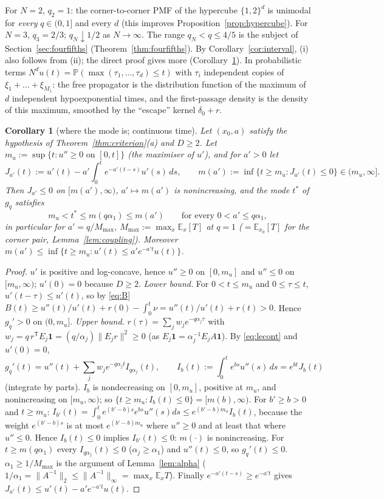 \documentclass[11pt,a4paper]{article}
\newtheorem{corollary}[theorem]{Corollary}
\theoremstyle{definition}
\newcommand{\one}{\mathbf 1}
\newcommand{\Prob}{\mathbb P}
\newcommand{\E}{\mathbb E}
\newcommand{\T}{^{\mathsf T}}
\begin{document}
For $N=2$, $q_2=1$: the corner-to-corner PMF of the hypercube $\{1,2\}^d$ is unimodal for \emph{every} $q\in(0,1]$ and every $d$ (this improves Proposition~\ref{prop:hypercube}). For $N=3$, $q_3=2/3$; $q_N\downarrow1/2$ as $N\to\infty$. The range $q_N<q\le4/5$ is the subject of Section~\ref{sec:fourfifths} (Theorem~\ref{thm:fourfifths}). By Corollary~\ref{cor:interval}, (i) also follows from (ii); the direct proof gives more (Corollary~\ref{cor:mode}). In probabilistic terms $N^du(t)=\Prob(\max(\tau_1,\dots,\tau_d)\le t)$ with $\tau_i$ independent copies of $\xi_1+\dots+\xi_{M_1}$: the free propagator is the distribution function of the maximum of $d$ independent hypoexponential times, and the first-passage density is the density of this maximum, smoothed by the ``escape'' kernel $\delta_0+r$.

\begin{corollary}[where the mode is; continuous time]\label{cor:mode}
Let $(x_0,a)$ satisfy the hypothesis of Theorem~\ref{thm:criterion}(a) and $D\ge2$. Let $m_u:=\sup\{t:u''\ge0\text{ on }[0,t]\}$ (the maximiser of $u'$), and for $a'>0$ let
\[
J_{a'}(t):=u'(t)-a'\int_0^te^{-a'(t-s)}u'(s)\,ds,\qquad m(a'):=\inf\{t\ge m_u:J_{a'}(t)\le0\}\in(m_u,\infty].
\]
Then $J_{a'}\le0$ on $[m(a'),\infty)$, $a'\mapsto m(a')$ is nonincreasing, and the mode $t^*$ of $g_q$ satisfies
\[
m_u<t^*\le m(q\alpha_1)\le m(a')\qquad\text{for every }0<a'\le q\alpha_1,
\]
in particular for $a'=q/M_{\max}$, $M_{\max}:=\max_x\E_x[T]$ at $q=1$ ($=\E_{x_0}[T]$ for the corner pair, Lemma~\ref{lem:coupling}). Moreover $m(a')\le\inf\{t\ge m_u:u'(t)\le a'e^{-a't}u(t)\}$.
\end{corollary}
\begin{proof}
$u'$ is positive and log-concave, hence $u''\ge0$ on $[0,m_u]$ and $u''\le0$ on $[m_u,\infty)$; $u'(0)=0$ because $D\ge2$.
\emph{Lower bound.} For $0<t\le m_u$ and $0\le\tau\le t$, $u'(t-\tau)\le u'(t)$, so by \eqref{eq:B} $B(t)\ge u''(t)/u'(t)+r(0)-\int_0^t\nu=u''(t)/u'(t)+r(t)>0$. Hence $g_q'>0$ on $(0,m_u]$.
\emph{Upper bound.} $r(\tau)=\sum_jw_je^{-q\alpha_j\tau}$ with $w_j=q\,r\T E_j\one=(q/\alpha_j)\|E_jr\|^2\ge0$ (as $E_j\one=\alpha_j^{-1}E_jA\one$). By \eqref{eq:lecont} and $u'(0)=0$,
\[
g_q'(t)=u''(t)+\sum_jw_je^{-q\alpha_jt}I_{q\alpha_j}(t),\qquad I_b(t):=\int_0^te^{bs}u''(s)\,ds=e^{bt}J_b(t)
\]
(integrate by parts). $I_b$ is nondecreasing on $[0,m_u]$, positive at $m_u$, and nonincreasing on $[m_u,\infty)$; so $\{t\ge m_u:I_b(t)\le0\}=[m(b),\infty)$. For $b'\ge b>0$ and $t\ge m_u$: $I_{b'}(t)=\int_0^te^{(b'-b)s}e^{bs}u''(s)ds\le e^{(b'-b)m_u}I_b(t)$, because the weight $e^{(b'-b)s}$ is at most $e^{(b'-b)m_u}$ where $u''\ge0$ and at least that where $u''\le0$. Hence $I_b(t)\le0$ implies $I_{b'}(t)\le0$: $m(\cdot)$ is nonincreasing. For $t\ge m(q\alpha_1)$ every $I_{q\alpha_j}(t)\le0$ ($\alpha_j\ge\alpha_1$) and $u''(t)\le0$, so $g_q'(t)\le0$. $\alpha_1\ge1/M_{\max}$ is the argument of Lemma~\ref{lem:alpha} ($1/\alpha_1=\|A^{-1}\|_2\le\|A^{-1}\|_\infty=\max_x\E_xT$). Finally $e^{-a'(t-s)}\ge e^{-a't}$ gives $J_{a'}(t)\le u'(t)-a'e^{-a't}u(t)$.
\end{proof}
\end{document}
